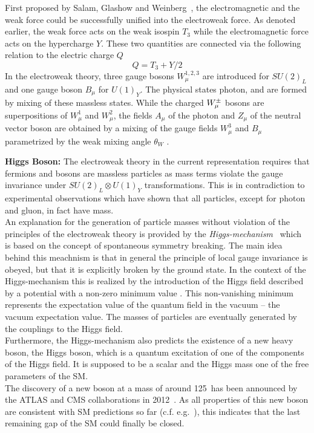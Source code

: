 \begin{description}
\begin{description}
 \end{description}
First proposed by Salam, Glashow and Weinberg~\cite{Glashow:1961tr, Weinberg:1967tq}, the electromagnetic and the weak force could be successfully unified into the electroweak force. As denoted earlier, the weak force acts on the weak isospin $T_{3}$ while the electromagnetic force acts on the hypercharge $Y$. These two quantities are connected via the following relation to the electric charge $Q$
\begin{equation*}
Q = T_{3} + Y/2
\end{equation*}
In the electroweak theory, three gauge bosons $W^{1,2,3}_{\mu}$ are introduced for $SU(2)_{L}$ and one gauge boson $B_{\mu}$ for $U(1)_{Y}$. The physical states photon, \Wpm and \Z are formed by mixing of these massless states. While the charged $W^{\pm}_{\mu}$ bosons are superpositions of $W^{1}_{\mu}$ and $W^{2}_{\mu}$, the fields $A_{\mu}$ of the photon and $Z_{\mu}$ of the neutral vector boson are obtained by a mixing of the gauge fields $W^{3}_{\mu}$ and $B_{\mu}$ parametrized by the weak mixing angle $\theta_{W}$ .  
\item \textbf{Higgs Boson:} The electroweak theory in the current representation requires that fermions and bosons are massless particles as mass terms violate the gauge invariance under $SU(2)_{L} \otimes U(1)_{Y}$ transformations. This is in contradiction to experimental observations which have shown that all particles, except for photon and gluon, in fact have mass. \\
An explanation for the generation of particle masses without violation of the principles of the electroweak theory is provided by the \textit{Higgs-mechanism}~\cite{PhysRevLett.13.508, PhysRevLett.13.321, PhysRevLett.13.585} which is based on the concept of spontaneous symmetry breaking. The main idea behind this meachnism is that in general the principle of local gauge invariance is obeyed, but that it is explicitly broken by the ground state. In the context of the Higgs-mechanism this is realized by the introduction of the Higgs field described by a potential with a non-zero minimum value . This non-vanishing minimum represents the expectation value of the quantum field in the vacuum -- the vacuum expectation value. The masses of particles are eventually generated by the couplings to the Higgs field. \\
Furthermore, the Higgs-mechanism also predicts the existence of a new heavy boson, the Higgs boson, which is a quantum excitation of one of the components of the Higgs field. It is supposed to be a scalar and the Higgs mass one of the free parameters of the SM. \\
The discovery of a new boson at a mass of around 125~\gev has been announced by the ATLAS and CMS collaborations in 2012~\cite{Aad:2012tfa, Chatrchyan:2012ufa}. As all properties of this new boson are consistent with SM predictions so far (c.f. e.g.~\cite{Aad:2013wqa, Aad:2014eva, Aad:2014eha, CMS-PAS-HIG-14-009}), this indicates that the last remaining gap of the SM could finally be closed.   
\end{description}

